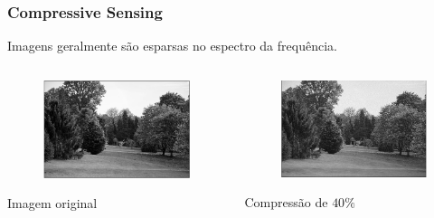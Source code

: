 \documentclass[11pt]{beamer}
\begin{document}
\begin{frame}
\frametitle{Compressive Sensing}
Imagens geralmente são esparsas no espectro da frequência.

\begin{columns}[t]
\begin{center}
\begin{figure}
\includegraphics[scale=.4]{imagens/Beale_Arboretum_gray.png}
\end{figure}
Imagem original
\end{center}

\begin{center}
\begin{figure}
\includegraphics[scale=.4]{imagens/Beale_Arboretum_60porc_freq_maiores.png}
\end{figure}
Compressão de $40\%$
\end{center}
\end{columns}
\end{frame}
\end{document}
